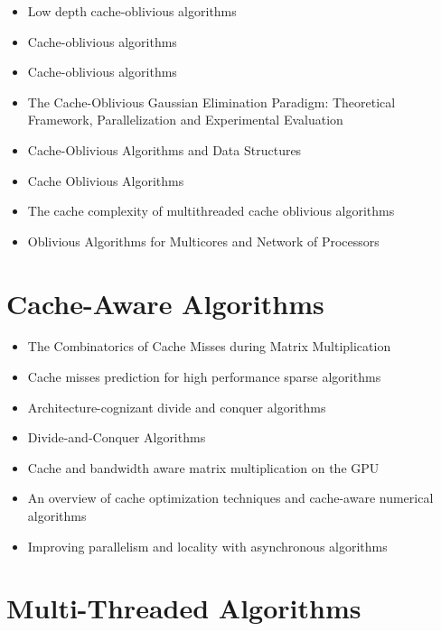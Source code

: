 \begin{itemize}
\item[\textbullet] Low depth cache-oblivious algorithms
  \cite{Blelloch2009}
\item[\textbullet] Cache-oblivious algorithms \cite{Frigo1999}
\item[\textbullet] Cache-oblivious algorithms \cite{Frigo1999}
\item[\textbullet] The Cache-Oblivious Gaussian Elimination Paradigm:
  Theoretical Framework, Parallelization and Experimental Evaluation
  \cite{Chowdhury2007}
\item[\textbullet] Cache-Oblivious Algorithms and Data Structures
  \cite{Demaine2002}
\item[\textbullet] Cache Oblivious Algorithms \cite{Kumar2003}
\item[\textbullet] The cache complexity of multithreaded cache
  oblivious algorithms \cite{Frigo2009}
\item[\textbullet] Oblivious Algorithms for Multicores and Network of
  Processors \cite{Chowdhury2009}
\end{itemize}


\section*{Cache-Aware Algorithms}
\label{sec:lr-cache-aware-algorithms}

\begin{itemize}
\item[\textbullet] The Combinatorics of Cache Misses during Matrix
  Multiplication \cite{Chatterjee2000}
\item[\textbullet] Cache misses prediction for high performance sparse
  algorithms \cite{Fraguela1998}
\item[\textbullet] Architecture-cognizant divide and conquer
  algorithms \cite{Gatlin1999}
\item[\textbullet] Divide-and-Conquer Algorithms \cite{Gurari2010}
\item[\textbullet] Cache and bandwidth aware matrix multiplication on
  the GPU \cite{Hall2001}
\item[\textbullet] An overview of cache optimization techniques and
  cache-aware numerical algorithms \cite{Kowarschik2003}
\item[\textbullet] Improving parallelism and locality with
  asynchronous algorithms \cite{Liu2010}
\end{itemize}


\section*{Multi-Threaded Algorithms}
\label{sec:lr-multi-threaded-algorithms}

